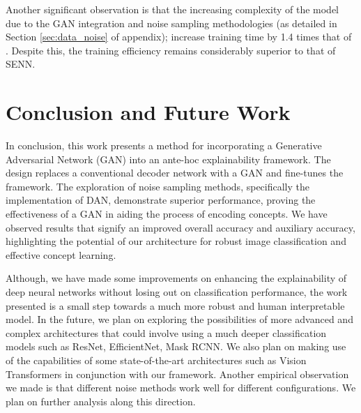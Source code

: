 \documentclass[letterpaper]{article}
\begin{document}
Another significant observation is that the increasing complexity of the model due to the GAN integration and noise sampling methodologies (as detailed in Section \ref{sec:data_noise} of appendix); increase training time by 1.4 times that of \cite{Sarkar2021AFF}. Despite this, the training efficiency remains considerably superior to that of SENN.





\section{Conclusion and Future Work}\label{sec:conclusion}
In conclusion, this work presents a method for incorporating a Generative Adversarial Network (GAN) into an ante-hoc explainability framework. The design replaces a conventional decoder network with a GAN and fine-tunes the framework. The exploration of noise sampling methods, specifically the implementation of DAN, demonstrate superior performance, proving the effectiveness of a GAN in aiding the process of encoding concepts.
We have observed results that signify an improved overall accuracy and auxiliary accuracy, highlighting the potential of our architecture for robust image classification and effective concept learning.

Although, we have made some improvements on enhancing the explainability of deep neural networks without losing out on classification performance, the work presented is a small step towards a much more robust and human interpretable model.
In the future, we plan on exploring the possibilities of more advanced and complex architectures that could involve using a much deeper classification models such as ResNet, EfficientNet, Mask RCNN. We also plan on making use of the capabilities of some state-of-the-art architectures such as Vision Transformers in conjunction with our framework. Another empirical observation we made is that different noise methods work well for different configurations. We plan on further analysis along this direction.
\end{document}
